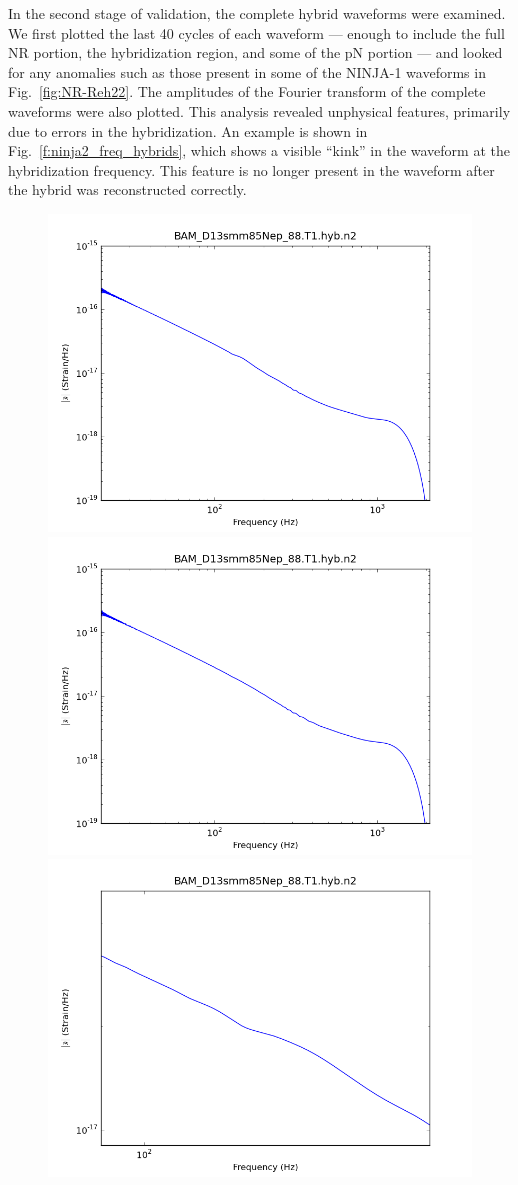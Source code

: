 In the second stage of validation, the complete hybrid waveforms were
examined.  We first plotted the last 40 cycles of each waveform ---
enough to include the full NR portion, the hybridization region, and
some of the pN portion --- and looked for any anomalies such as those
present in some of the NINJA-1 waveforms in Fig.~\ref{fig:NR-Reh22}.
The amplitudes of the Fourier transform of the complete waveforms were
also plotted.  This analysis revealed unphysical features, primarily
due to errors in the hybridization.  An example is shown in
Fig.~\ref{f:ninja2_freq_hybrids}, which shows a visible ``kink'' in
the waveform at the hybridization frequency.  This feature is no
longer present in the waveform after the hybrid was reconstructed
correctly.

\begin{figure}
  \includegraphics[width=0.5\linewidth]{figures/ninja2/BAM_D13smm85Nep_88_T1_hyb_n2_amp_old}
  \includegraphics[width=0.5\linewidth]{figures/ninja2/BAM_D13smm85Nep_88_T1_hyb_n2_amp_new} \\
  \includegraphics[width=0.5\linewidth]{figures/ninja2/BAM_D13smm85Nep_88_T1_hyb_n2_amp_old_zoom}

\end{figure}
